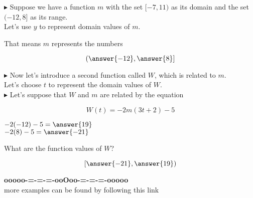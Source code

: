 \documentclass{ximera}
\begin{document}
\begin{example}




\textbf{\textcolor{blue!55!black}{$\blacktriangleright$}}  Suppose we have a function $m$ with the set $[-7, 11)$ as its domain and the set $(-12, 8]$ as its range. \\

Let's use $y$ to represent domain values of $m$.  



\begin{question}

That means $m$ represents the numbers 

\[
\left( \answer{-12}, \answer{8} \right]
\]

\end{question}






\textbf{\textcolor{blue!55!black}{$\blacktriangleright$}} Now let's introduce a second function called $W$, which is related to $m$. \\

Let's choose $t$ to represent the domain values of $W$. \\


\textbf{\textcolor{blue!55!black}{$\blacktriangleright$}} Let's suppose that $W$ and $m$ are related by the equation 

\[ 
W(t) = -2 m(3t + 2) - 5
\]





\begin{question}

$-2 (-12) - 5 = \answer{19}$ \\

$-2 (8) - 5 = \answer{-21}$ \\

\end{question}






\begin{question}

What are the function values of $W$?


\[
\left[ \answer{-21}, \answer{19} \right)
\]


\end{question}


\end{example}


















\begin{center}
\textbf{\textcolor{green!50!black}{ooooo-=-=-=-ooOoo-=-=-=-ooooo}} \\

more examples can be found by following this link\\ 

\end{center}
\end{document}
